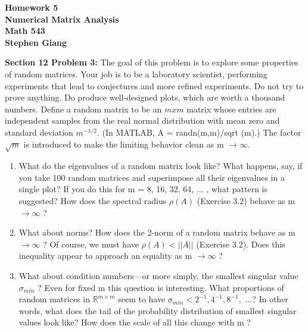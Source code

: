 \documentclass[12pt]{article}
\begin{document}
	
	\begin{center}
		\textbf{Homework 5} \\
		\textbf{Numerical Matrix Analysis} \\
		\textbf{Math 543} \\
		\textbf{Stephen Giang} \\
	\end{center}

\noindent \textbf{Section 12 Problem 3: }The goal of this problem is to explore some properties of random matrices. Your job is to be a laboratory scientist, performing experiments that lead to conjectures and more refined experiments. Do not try to prove anything. Do produce well-designed plots, which are worth a thousand numbers. Define a random matrix to be an $m x m$ matrix whose entries are independent samples from the real normal distribution with mean zero and standard deviation $m^{-1/2}$. (In MATLAB, A = randn(m,m)/sqrt (m).) The factor $\sqrt{m}$ is introduced to make the limiting behavior clean as m $\rightarrow \infty$.

	\begin{enumerate}[label = (\alph*)]
		\item What do the eigenvalues of a random matrix look like? What happens, say, if you take 100 random matrices and superimpose all their eigenvalues in a single plot? If you do this for m = 8, 16, 32, 64, ... , what pattern is suggested? How does the spectral radius $\rho(A)$ (Exercise 3.2) behave as m $\rightarrow \infty$ ?
		\item  What about norms? How does the 2-norm of a random matrix behave as m $\rightarrow \infty$ ? Of course, we must have $\rho(A) < || A ||$ (Exercise 3.2). Does this inequality appear to approach an equality as m $\rightarrow \infty$ ?
		\item  What about condition numbers—or more simply, the smallest singular value $\sigma_{min}$ ? Even for fixed m this question is interesting. What proportions of random matrices in $\mathbb{R}^{m \times m}$ seem to have $\sigma_{min} < 2^{-1}, 4^{-1}, 8^{-1},$ ...? In other words, what does the tail of the probability distribution of smallest singular values look like? How does the scale of all this change with m ? 
	\end{enumerate} 

\vspace{\baselineskip}
\vspace{\baselineskip}
\end{document}
